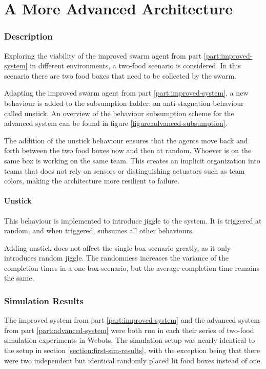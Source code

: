 \documentclass[a4paper]{article}
\begin{document}
\part{A More Advanced Architecture}
\label{part:advanced-system}

\section{Description}

Exploring the viability of the improved swarm agent from part \vref{part:improved-system} in different environments, a two-food scenario is considered.
In this scenario there are two food boxes that need to be collected by the swarm.

Adapting the improved swarm agent from part \ref{part:improved-system}, a new behaviour is added to the subsumption ladder: an anti-stagnation behaviour called unstick.
An overview of the behaviour subsumption scheme for the advanced system can be found in figure \vref{figure:advanced-subsumption}.

The addition of the unstick behaviour ensures that the agents move back and forth between the two food boxes now and then at random.
Whoever is on the same box is working on the same team.
This creates an implicit organization into teams that does not rely on sensors or distinguishing actuators such as team colors, making the architecture more resilient to failure.

\subsection{Unstick}
This behaviour is implemented to introduce jiggle to the system. It is triggered at random, and when triggered, subsumes all other behaviours. 

Adding unstick does not affect the single box scenario greatly, as it only introduces random jiggle.
The randomness increases the variance of the completion times in a one-box-scenario, but the average completion time remains the same.



\section{Simulation Results}

The improved system from part \ref{part:improved-system} and the advanced system from part \vref{part:advanced-system} were both run in each their series of two-food simulation experiments in Webots.
The simulation setup was nearly identical to the setup in section \vref{section:first-sim-results}, with the exception being that there were two independent but identical randomly placed lit food boxes instead of one.
\end{document}
